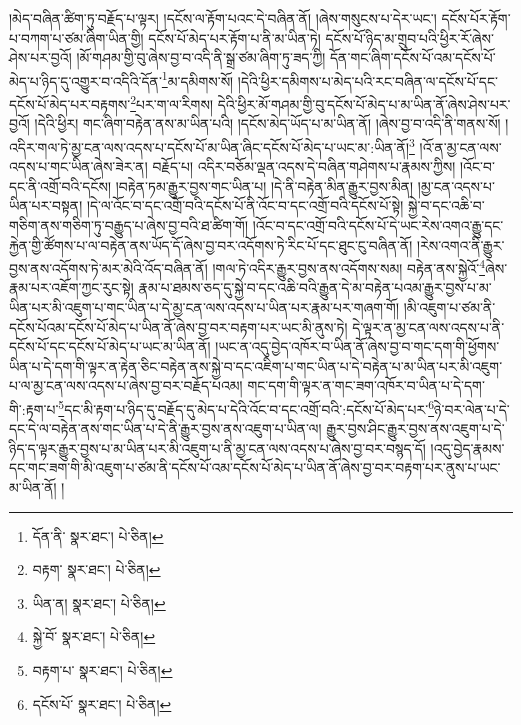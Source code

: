 །མེད་བཞིན་ཚིག་ཏུ་བརྗོད་པ་ལྟར། །དངོས་ལ་རྟོག་པའང་དེ་བཞིན་ནོ། །ཞེས་གསུངས་པ་དེར་ཡང་། དངོས་པོར་རྟོག་པ་བཀག་པ་ཙམ་ཞིག་ཡིན་གྱི། དངོས་པོ་མེད་པར་རྟོག་པ་ནི་མ་ཡིན་ཏེ། དངོས་པོ་ཉིད་མ་གྲུབ་པའི་ཕྱིར་རོ་ཞེས་ཤེས་པར་བྱའོ། །མོ་གཤམ་གྱི་བུ་ཞེས་བྱ་བ་འདི་ནི་སྒྲ་ཙམ་ཞིག་ཏུ་ཟད་ཀྱི། དོན་གང་ཞིག་དངོས་པོ་འམ་དངོས་པོ་མེད་པ་ཉིད་དུ་འགྱུར་བ་འདིའི་དོན་\footnote{དོན་ནི་  སྣར་ཐང་།  པེ་ཅིན། }མ་དམིགས་སོ། །དེའི་ཕྱིར་དམིགས་པ་མེད་པའི་རང་བཞིན་ལ་དངོས་པོ་དང་དངོས་པོ་མེད་པར་བརྟགས་\footnote{བརྟག་  སྣར་ཐང་།  པེ་ཅིན། }པར་ག་ལ་རིགས། དེའི་ཕྱིར་མོ་གཤམ་གྱི་བུ་དངོས་པོ་མེད་པ་མ་ཡིན་ནོ་ཞེས་ཤེས་པར་བྱའོ། །དེའི་ཕྱིར། གང་ཞིག་བརྟེན་ནས་མ་ཡིན་པའི། །དངོས་མེད་ཡོད་པ་མ་ཡིན་ནོ། །ཞེས་བྱ་བ་འདི་ནི་གནས་སོ། །འདིར་གལ་ཏེ་མྱ་ངན་ལས་འདས་པ་དངོས་པོ་མ་ཡིན་ཞིང་དངོས་པོ་མེད་པ་ཡང་མ་:ཡིན་ནོ།\footnote{ཡིན་ན།  སྣར་ཐང་།  པེ་ཅིན། } །འོ་ན་མྱ་ངན་ལས་འདས་པ་གང་ཡིན་ཞེས་ཟེར་ན། བརྗོད་པ། འདིར་བཅོམ་ལྡན་འདས་དེ་བཞིན་གཤེགས་པ་རྣམས་ཀྱིས། །འོང་བ་དང་ནི་འགྲོ་བའི་དངོས། །བརྟེན་ཏམ་རྒྱུར་བྱས་གང་ཡིན་པ། །དེ་ནི་བརྟེན་མིན་རྒྱུར་བྱས་མིན། །མྱ་ངན་འདས་པ་ཡིན་པར་བསྟན། །དེ་ལ་འོང་བ་དང་འགྲོ་བའི་དངོས་པོ་ནི་འོང་བ་དང་འགྲོ་བའི་དངོས་པོ་སྟེ། སྐྱེ་བ་དང་འཆི་བ་གཅིག་ནས་གཅིག་ཏུ་བརྒྱུད་པ་ཞེས་བྱ་བའི་ཐ་ཚིག་གོ། །འོང་བ་དང་འགྲོ་བའི་དངོས་པོ་དེ་ཡང་རེས་འགའ་རྒྱུ་དང་རྐྱེན་གྱི་ཚོགས་པ་ལ་བརྟེན་ནས་ཡོད་དོ་ཞེས་བྱ་བར་འདོགས་ཏེ་རིང་པོ་དང་ཐུང་ངུ་བཞིན་ནོ། །རེས་འགའ་ནི་རྒྱུར་བྱས་ནས་འདོགས་ཏེ་མར་མེའི་འོད་བཞིན་ནོ། །གལ་ཏེ་འདིར་རྒྱུར་བྱས་ནས་འདོགས་སམ། བརྟེན་ནས་སྐྱེའོ་\footnote{སྐྱེ་བོ་  སྣར་ཐང་།  པེ་ཅིན། }ཞེས་རྣམ་པར་འཇོག་ཀྱང་རུང་སྟེ། རྣམ་པ་ཐམས་ཅད་དུ་སྐྱེ་བ་དང་འཆི་བའི་རྒྱུན་དེ་མ་བརྟེན་པའམ་རྒྱུར་བྱས་པ་མ་ཡིན་པར་མི་འཇུག་པ་གང་ཡིན་པ་དེ་མྱ་ངན་ལས་འདས་པ་ཡིན་པར་རྣམ་པར་གཞག་གོ། །མི་འཇུག་པ་ཙམ་ནི་དངོས་པོའམ་དངོས་པོ་མེད་པ་ཡིན་ནོ་ཞེས་བྱ་བར་བརྟག་པར་ཡང་མི་ནུས་ཏེ། དེ་ལྟར་ན་མྱ་ངན་ལས་འདས་པ་ནི་དངོས་པོ་དང་དངོས་པོ་མེད་པ་ཡང་མ་ཡིན་ནོ། །ཡང་ན་འདུ་བྱེད་འཁོར་བ་ཡིན་ནོ་ཞེས་བྱ་བ་གང་དག་གི་ཕྱོགས་ཡིན་པ་དེ་དག་གི་ལྟར་ན་རྟེན་ཅིང་བརྟེན་ནས་སྐྱེ་བ་དང་འཇིག་པ་གང་ཡིན་པ་དེ་བརྟེན་པ་མ་ཡིན་པར་མི་འཇུག་པ་ལ་མྱ་ངན་ལས་འདས་པ་ཞེས་བྱ་བར་བརྗོད་པའམ། གང་དག་གི་ལྟར་ན་གང་ཟག་འཁོར་བ་ཡིན་པ་དེ་དག་གི་:རྟག་པ་\footnote{བརྟག་པ་  སྣར་ཐང་།  པེ་ཅིན། }དང་མི་རྟག་པ་ཉིད་དུ་བརྗོད་དུ་མེད་པ་དེའི་འོང་བ་དང་འགྲོ་བའི་:དངོས་པོ་མེད་པར་\footnote{དངོས་པོ་  སྣར་ཐང་།  པེ་ཅིན། }ཉེ་བར་ལེན་པ་དེ་དང་དེ་ལ་བརྟེན་ནས་གང་ཡིན་པ་དེ་ནི་རྒྱུར་བྱས་ནས་འཇུག་པ་ཡིན་ལ། རྒྱུར་བྱས་ཤིང་རྒྱུར་བྱས་ནས་འཇུག་པ་དེ་ཉིད་ད་ལྟར་རྒྱུར་བྱས་པ་མ་ཡིན་པར་མི་འཇུག་པ་ནི་མྱ་ངན་ལས་འདས་པ་ཞེས་བྱ་བར་བསྙད་དོ། །འདུ་བྱེད་རྣམས་དང་གང་ཟག་གི་མི་འཇུག་པ་ཙམ་ནི་དངོས་པོ་འམ་དངོས་པོ་མེད་པ་ཡིན་ནོ་ཞེས་བྱ་བར་བརྟག་པར་ནུས་པ་ཡང་མ་ཡིན་ནོ། །
